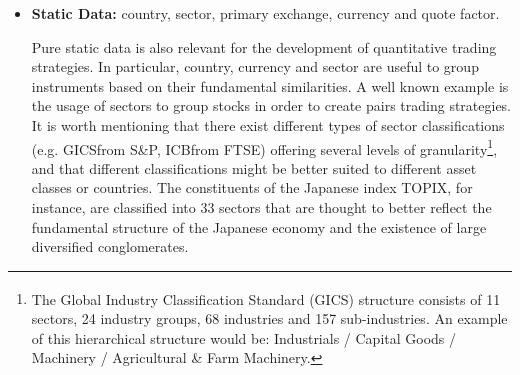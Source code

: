\begin{itemize}
Mergers \& Acquisitions and Spin-offs are also regular events in the lifecycle of corporations. Their history needs to be recorded in order to account for the resulting changes in valuation that might affect a given ticker or tickers. These situations can also be exploited by trading strategies known as Merger Arbitrage.


Stocks quotation can be suspended as a cooling mechanism (often at the request of the underlying company) to prevent excess price volatility when significant information is about to be released to the market. Depending on the situation, the suspension can be temporary and intraday, or can last for extended periods of time if the market place allows it.\footnote{For instance, it was the case for a large number of companies in China in 2016.} Suspensions result in gaps in time series and are worth keeping track of, as they can impact strategies in backtesting (inability to enter or exit a position, uncertainty in the pricing of composite assets if a given stock has a significant weight in ETFs or Indexes). 
Some markets will also suspend trading if the price swings more than a predefined amount (limit up / limit down situations) for either a period of time or for the remainder of the trading session.


\item \textbf{Static Data:} country, sector, primary exchange, currency and quote factor.


Pure static data is also relevant for the development of quantitative trading strategies. In particular, country, currency and sector are useful to group instruments based on their fundamental similarities. A well known example is the usage of sectors to group stocks in order to create pairs trading strategies. It is worth mentioning that there exist different types of sector classifications (e.g. GICS\textsuperscript\textregistered from S\&P, ICB\textsuperscript\textregistered from FTSE) offering several levels of granularity\footnote{The Global Industry Classification Standard (GICS\textsuperscript\textregistered) structure consists of 11 sectors, 24 industry groups, 68 industries and 157 sub-industries. An example of this hierarchical structure would be: Industrials / Capital Goods / Machinery / Agricultural \& Farm Machinery.}, and that different classifications might be better suited to different asset classes or countries. The constituents of the Japanese index TOPIX, for instance, are classified into 33 sectors that are thought to better reflect the fundamental structure of the Japanese economy and the existence of large diversified conglomerates. 



\end{itemize}
